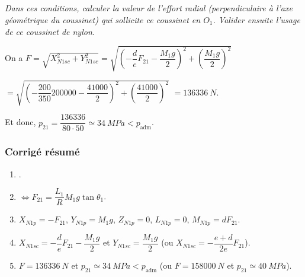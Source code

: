\documentclass[10pt,fleqn]{article} %
\begin{document}
\begin{multicols}{2}
\subparagraph{}\textit{Dans ces conditions, calculer la valeur de l’effort radial (perpendiculaire à l’axe géométrique du coussinet) qui sollicite ce coussinet en $O_1$.
Valider ensuite l’usage de ce coussinet de nylon.}
\ifprof
\begin{corrige}
On a 
$F = \sqrt{X_{N1sc}^2+Y_{N1sc}^2}
= \sqrt{\left(-\dfrac{d}{e}F_{21} - \dfrac{M_1g}{2} \right)^2+\left( \dfrac{M_1g}{2}\right)^2}$

$= \sqrt{\left(-\dfrac{200}{350}200000 -  \dfrac{41000}{2}\right)^2+\left( \dfrac{41000}{2}\right)^2}$
$=\SI{136336}{N}$.

Et donc, $p_{21}=\dfrac{136336}{80\cdot 50}\simeq \SI{34}{MPa}<p_{\text{adm}}$.
\end{corrige}
\else
\fi

\ifprof
\else
\subsubsection*{Corrigé résumé}
\footnotesize
\begin{enumerate}
\item .
\item $\Leftrightarrow F_{21}=\dfrac{L_1}{R} M_1g\tan\theta_1 $.
\item $X_{N1p} = - F_{21}$, $Y_{N1p}= M_1g$, $Z_{N1p}=0$, $
 L_{N1p} = {0}$, $M_{N1p} =dF_{21}$.
\item $X_{N1sc}=-\dfrac{d}{e}F_{21} - \dfrac{M_1g}{2}$ et $Y_{N1sc} = \dfrac{M_1g}{2}$ (ou $X_{N1sc}=-\dfrac{e+d}{2e}F_{21}$).
\item $F=\SI{136336}{N}$ et $p_{21}\simeq \SI{34}{MPa}<p_{\text{adm}}$ (ou $F=\SI{158000}{N}$ et $p_{21}\simeq \SI{40}{MPa}$).
\end{enumerate}
\normalsize
\fi



\ifprof
\else
\end{multicols}
\fi
\end{document}
